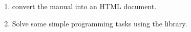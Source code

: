 \documentclass[12pt]{article}
\begin{document}
\begin{enumerate}
\item
convert the manual into an HTML document.
\item
Solve some simple programming tasks using the library.
\end{enumerate}
\end{document}
